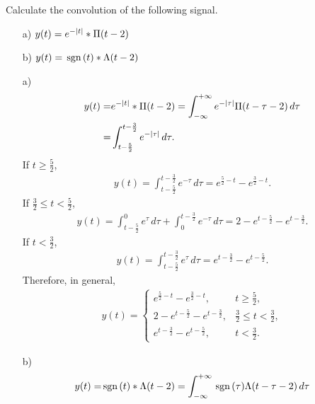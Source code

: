 \documentclass{assignment}
\begin{document}
\begin{prob}[10 pts]
    Calculate the convolution of the following signal.
    \begin{itemize}
        \item[a)] $y(t)=e^{-\left\lvert t\right\rvert}*\Pi(t-2)$
        \item[b)] $y(t)=\,\text{sgn}\,(t)*\Lambda(t-2)$
    \end{itemize}
\end{prob}
\begin{sol}
    \begin{itemize}
        \item[a)] 
        \begin{align}
            \notag y(t)=&e^{-\left\lvert t\right\rvert}*\Pi(t-2)=\int_{-\infty}^{+\infty}e^{-\left\lvert\tau\right\rvert}\Pi(t-\tau-2)\,d\tau\\
            =&\int_{t-\frac{5}{2}}^{t-\frac{3}{2}}e^{-\left\lvert\tau\right\rvert}\,d\tau.
        \end{align}
        If $t\geq \frac{5}{2}$,
        \begin{align}
            y(t)=\int_{t-\frac{5}{2}}^{t-\frac{3}{2}}e^{-\tau}\,d\tau=e^{\frac{5}{2}-t}-e^{\frac{3}{2}-t}.
        \end{align}
        If $\frac{3}{2}\leq t<\frac{5}{2}$,
        \begin{align}
            y(t)=\int_{t-\frac{5}{2}}^0e^{\tau}\,d\tau+\int_0^{t-\frac{3}{2}}e^{-\tau}\,d\tau=2-e^{t-\frac{5}{2}}-e^{t-\frac{3}{2}}.
        \end{align}
        If $t<\frac{3}{2}$,
        \begin{align}
            y(t)=\int_{t-\frac{5}{2}}^{t-\frac{3}{2}}e^{\tau}\,d\tau=e^{t-\frac{3}{2}}-e^{t-\frac{5}{2}}.
        \end{align}
        Therefore, in general,
        \begin{align}
            y(t)=\left\{\begin{array}{ll}
                e^{\frac{5}{2}-t}-e^{\frac{3}{2}-t},&t\geq\frac{5}{2},\\
                2-e^{t-\frac{5}{2}}-e^{t-\frac{3}{2}},&\frac{3}{2}\leq t<\frac{3}{2},\\
                e^{t-\frac{3}{2}}-e^{t-\frac{5}{2}},&t<\frac{3}{2}.
            \end{array}\right.
        \end{align}
        \item[b)] 
        \begin{align}
            \notag y(t)=&\sgn(t)*\Lambda(t-2)=\int_{-\infty}^{+\infty}\sgn(\tau)\Lambda(t-\tau-2)\,d\tau\\

\end{align}
\end{itemize}
\end{sol}
\end{document}
